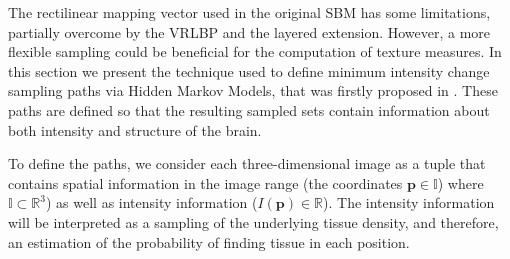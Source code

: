 \label{sec:hmmpaths}
The rectilinear mapping vector used in the original \ac{SBM} \cite{Martinez-Murcia2014225,Martinez-MurciaVRLBP,Martinez-Murcia2015} has some limitations, partially overcome by the \ac{VRLBP} and the layered extension. However, a more flexible sampling could be beneficial for the computation of texture measures. In this section we present the technique used to define minimum intensity change sampling paths via Hidden Markov Models, that was firstly proposed in \cite{Martinez-Murcia2016}. These paths are defined so that the resulting sampled sets contain information about both intensity and structure of the brain. 

To define the paths, we consider each three-dimensional image as a tuple that contains spatial information in the image range (the coordinates $\mathbf{p} \in \mathbb{I}$) where $\mathbb{I}\subset \mathbb{R}^3$) as well as intensity information ($I(\mathbf{p}) \in \mathbb{R}$). The intensity information will be interpreted as a sampling of the underlying tissue density, and therefore, an estimation of the probability of finding tissue in each position. 

